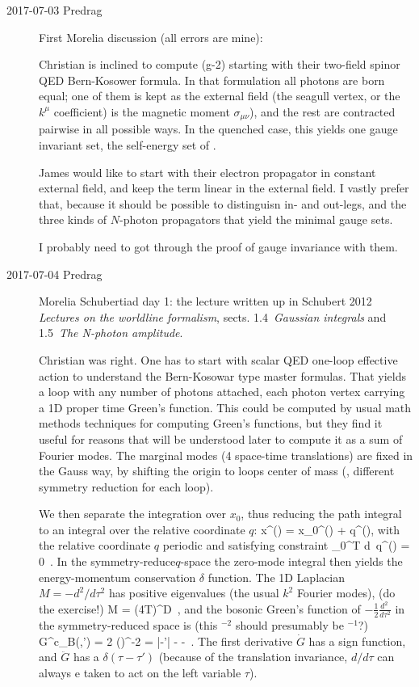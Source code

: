 \begin{description}

\item[2017-07-03 Predrag] First Morelia discussion (all errors are mine):

Christian is inclined to compute (g-2) starting with their two-field
spinor QED Bern-Kosower formula. In that formulation all photons are born equal;
one of them is kept as the external field (the seagull vertex, or the $k^\mu$
coefficient) is the
magnetic moment $\sigma_{\mu\nu}$), and the rest are contracted pairwise in
all possible ways. In the quenched case, this yields one gauge invariant set,
the self-energy set of .

James would like to start with their electron propagator in constant
external field, and keep the term linear in the external field. I vastly
prefer that, because it should be possible to distinguisn in- and
out-legs, and the three kinds of $N$-photon propagators that yield the
minimal gauge sets.

I probably need to got through the proof of gauge invariance with them.

\item[2017-07-04 Predrag] Morelia Schubertiad day 1:
the lecture written up in Schubert 2012 {\em Lectures on
the worldline formalism}, sects. 1.4~{\em Gaussian integrals} and
1.5~{\em The N-photon amplitude}.

Christian was right. One has to start with scalar QED one-loop effective
action to understand the Bern-Kosowar type master formulas. That yields a
loop with any number of photons attached, each photon vertex carrying a
1D proper time Green's function. This could be computed by usual math
methods techniques for computing Green's functions, but they find it
useful for reasons that will be understood later to compute it as a sum
of Fourier modes. The marginal modes (4 space-time translations) are fixed
in the Gauss way, by shifting the origin to loops center of mass (\ie,
different symmetry reduction for each loop).

We then separate the integration over $x_0$, thus reducing the path integral
to an integral over the relative coordinate $q$:
\beq
x^{\mu}(\tau) = x_0^{\mu}(\tau) + q^{\mu}(\tau),
with  the relative coordinate $q$ periodic and satisfying constraint
\beq
\int_0^T d\tau\, q^{\mu}(\tau) = 0
\,.
In the symmetry-reduce$q$-space the zero-mode integral then yields
the energy-momentum conservation $\delta$ function. The 1D Laplacian
$M=-d^2/d\tau^2$ has positive eigenvalues (the usual $k^2$ Fourier modes),
(do the exercise!)
\beq
\det M = (4T)^D
\,,
and the bosonic Green's function of $-\frac{1}{2}\frac{d^2~}{d\tau^2}$ in
the symmetry-reduced space is
(this ${}^{-2}$ should presumably be ${}^{-1}$?)
\beq
G^c_B(\tau,\tau')
= 2 \bra{\tau}\left(\right)^{-2}
= |\tau-\tau'| -  - 
\,.
The first derivative $\dot{G}$  has a sign function, and $\ddot{G}$ has a
$\delta(\tau-\tau')$ (because of the translation invariance, $d/d\tau$
can always e taken to act on the left variable $\tau$).


\end{description}
